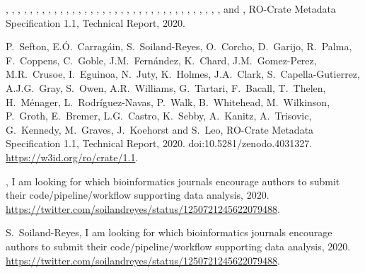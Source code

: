 \documentclass[ds,v1.1.2,openaccess]{iosart2x}%
\begin{document}
\begin{thebibliography}{}
%
\begin{botherref}
,
,
,
,
,
,
,
,
,
,
,
,
,
,
,
,
,
,
,
,
,
,
,
,
,
,
,
,
,
,
,
,
,
,
,
,
 and
,
{RO}-Crate Metadata Specification 1.1,
Technical Report,
2020.
\end{botherref}
%
\OrigBibText
P.~Sefton,
E.{\'{O}}.~Carrag\'{a}in,
S.~Soiland-Reyes,
O.~Corcho,
D.~Garijo,
R.~Palma,
F.~Coppens,
C.~Goble,
J.M.~Fern\'{a}ndez,
K.~Chard,
J.M.~Gomez-Perez,
M.R.~Crusoe,
I.~Eguinoa,
N.~Juty,
K.~Holmes,
J.A.~Clark,
S.~Capella-Gutierrez,
A.J.G.~Gray,
S.~Owen,
A.R.~Williams,
G.~Tartari,
F.~Bacall,
T.~Thelen,
H.~M\'{e}nager,
L.~Rodr\'iguez-Navas,
P.~Walk,
B.~Whitehead,
M.~Wilkinson,
P.~Groth,
E.~Bremer,
L.G.~Castro,
K.~Sebby,
A.~Kanitz,
A.~Trisovic,
G.~Kennedy,
M.~Graves,
J.~Koehorst and
S.~Leo,
{RO}-Crate Metadata Specification 1.1,
Technical Report,
2020.
doi:10.5281/zenodo.4031327.
\url{https://w3id.org/ro/crate/1.1}.
\endOrigBibText
{}
\endbibitem

%
\begin{botherref}
,
I am looking for which bioinformatics journals encourage authors
to submit their code/pipeline/workflow supporting data analysis,
2020.
\url{https://twitter.com/soilandreyes/status/1250721245622079488}.
\end{botherref}
%
\OrigBibText
S.~Soiland-Reyes,
I am looking for which bioinformatics journals encourage authors to submit
their code/pipeline/workflow supporting data analysis,
2020.
\url{https://twitter.com/soilandreyes/status/1250721245622079488}.
\endOrigBibText
{}
\endbibitem


\end{thebibliography}
\end{document}
